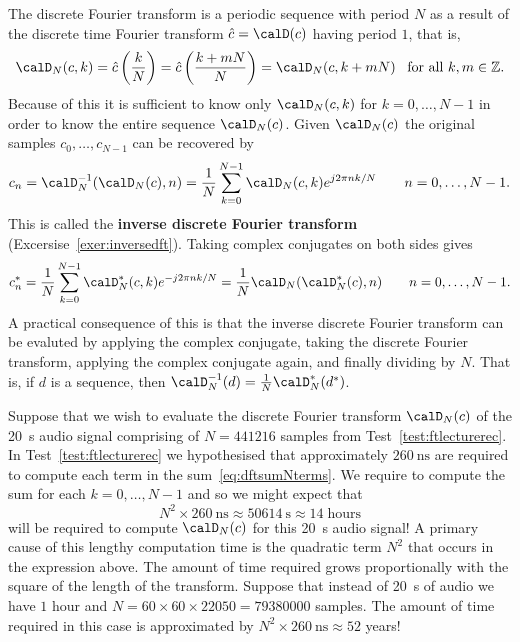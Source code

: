 \documentclass[11pt,a4paper]{book}
\theoremstyle{plain}
\numberwithin{equation}{section}
\newcommand{\ints}{{\mathbb Z}}
\newcommand{\term}{\textbf}
\newcounter{test}
\begin{document}
The discrete Fourier transform is a periodic sequence with period $N$ as a result of the discrete time Fourier transform $\hat{c} = \calD(c)$ having period $1$, that is,
\[
\calD_N(c,k) = \hat{c}\left( \frac{k}{N} \right) = \hat{c}\left( \frac{k + mN}{N} \right) = \calD_N(c,k+mN) \;\;\; \text{for all $k,m\in\ints$}.
\]
Because of this it is sufficient to know only $\calD_N(c,k)$ for $k = 0,\dots,N-1$ in order to know the entire sequence $\calD_N(c)$.  Given $\calD_N(c)$ the original samples $c_0, \dots, c_{N-1}$ can be recovered by 
\[
c_n = \calD_N^{-1}(\calD_N(c),n) = \frac{1}{N}\sum_{k = 0}^{N-1} \calD_N(c,k) e^{j 2\pi n k / N} \qquad n = 0, \dots, N-1.
\]
This is called the \term{inverse discrete Fourier transform} (Excersise~\ref{exer:inversedft}). Taking complex conjugates on both sides gives
\[
c_n^* = \frac{1}{N} \sum_{k = 0}^{N-1} \calD_N^*(c,k) e^{-j 2\pi n k / N} = \frac{1}{N} \calD_N(\calD_N^*(c), n)  \qquad n = 0, \dots, N-1.
\]
A practical consequence of this is that the inverse discrete Fourier transform can be evaluted by applying the complex conjugate, taking the discrete Fourier transform, applying the complex conjugate again, and finally dividing by $N$.  That is, if $d$ is a sequence, then $\calD_N^{-1}(d) = \tfrac{1}{N}\calD_N^*(d^*)$.

Suppose that we wish to evaluate the discrete Fourier transform $\calD_N(c)$ of the \SI{20}{\second} audio signal comprising of $N=441216$ samples from Test~\ref{test:ftlecturerec}.  In Test~\ref{test:ftlecturerec} we hypothesised that approximately $\SI{260}{\nano\second}$ are required to compute each term in the sum~\eqref{eq:dftsumNterms}.  We require to compute the sum for each $k = 0,\dots,N-1$ and so we might expect that
\begin{equation}\label{eq:runtimefftformulaapprox}
N^2 \times \SI{260}{\nano\second} \approx \SI{50614}{\second} \approx 14 \; \text{hours}
\end{equation}
will be required to compute $\calD_N(c)$ for this \SI{20}{\second} audio signal!  A primary cause of this lengthy computation time is the quadratic term $N^2$ that occurs in the expression above.  The amount of time required grows proportionally with the square of the length of the transform.  Suppose that instead of \SI{20}{\second} of audio we have $1$ hour and $N = 60 \times 60 \times 22050 = 79380000$ samples.  The amount of time required in this case is approximated by $N^2 \times \SI{260}{\nano\second}  \approx 52$ years!
\end{document}
